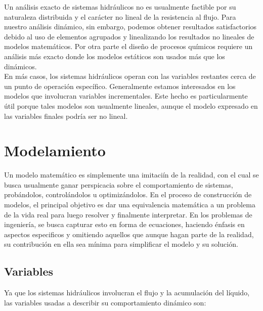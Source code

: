 \documentclass[a4paper,12pt,twoside]{proyectotanquesecci}
\begin{document}
Un análisis exacto de sistemas hidráulicos no es usualmente factible por su naturaleza distribuida y el carácter no lineal de la resistencia al flujo. Para nuestro análisis dinámico, sin embargo, podemos obtener resultados satisfactorios debido al uso de elementos agrupados y linealizando los resultados no lineales de modelos matemáticos. Por otra parte el diseño de procesos químicos requiere un análisis más exacto donde los modelos estáticos son usados más que los dinámicos.\\

En más casos, los sistemas hidráulicos operan con las variables restantes cerca de un punto de operación específico. Generalmente estamos interesados en los modelos que involucran variables incrementales. Este hecho es particularmente útil porque tales modelos son usualmente lineales, aunque el modelo expresado en las variables finales podría ser no lineal.\\

\newpage







\section{Modelamiento}

Un modelo matemático es simplemente una imitaciín de la realidad, con el cual se busca usualmente ganar perspicacia sobre el comportamiento de sistemas, probándolos, controlándolos u optimizándolos. En el proceso de construcción de modelos, el principal objetivo es dar una equivalencia matemática a un problema de la vida real para luego resolver y finalmente interpretar. En los problemas de ingeniería, se busca capturar esto en forma de ecuaciones, haciendo énfasis en aspectos especificos y omitiendo aquellos que aunque hagan parte de la realidad, su contribución en ella sea mínima para simplificar el modelo y su solución. \\

\subsection{Variables}

Ya que los sistemas hidráulicos involucran el flujo  y la acumulación del líquido, las variables usadas a describir su comportamiento dinámico son:\\
\end{document}

